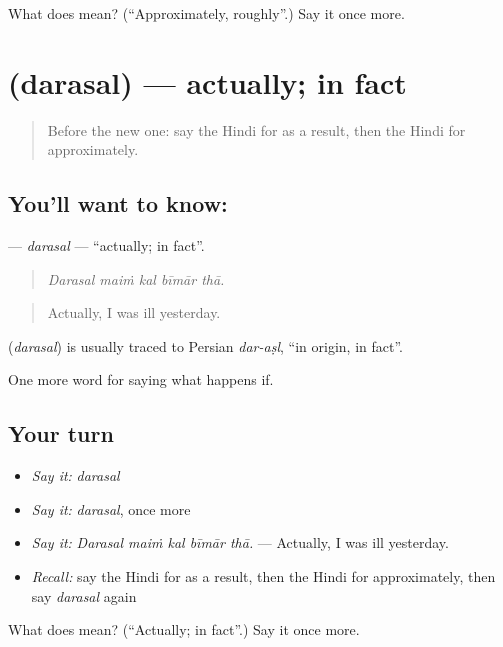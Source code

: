 \begin{tcolorbox}[breakable,colback=teal!4,colframe=teal!35!black,title={Before you move on}]
What does  mean? (\textquotedblleft{}Approximately, roughly\textquotedblright{}.) Say it once more.
\end{tcolorbox}
\section[\texorpdfstring{\hi{दरअसल} (darasal)}{दरअसल (darasal)}]{ (darasal) — actually; in fact}

\label{lesson:HI-C554-darasal}



\begin{quote}
Before the new one: say the Hindi for as a result, then the Hindi for approximately.
\end{quote}

\subsection*{You'll want to know: }
\textbf{} — \emph{darasal} — \textquotedblleft{}actually; in fact\textquotedblright{}.

\begin{quote}
    
\end{quote}

\begin{quote}
\emph{Darasal maiṁ kal bīmār thā.}
\end{quote}

\begin{quote}
Actually, I was ill yesterday.
\end{quote}

\begin{cousinweb}
\textbf{} (\emph{darasal}) is usually traced to Persian \emph{dar-aṣl}, \textquotedblleft{}in origin, in fact\textquotedblright{}.
\end{cousinweb}

\begin{grammarlens}[title={What you've built}]
One more word for saying what happens if.
\end{grammarlens}

\subsection*{Your turn}
\begin{itemize}
\raggedright
  \item \emph{Say it:} \emph{darasal}
  \item \emph{Say it:} \emph{darasal}, once more
  \item \emph{Say it:} \emph{Darasal maiṁ kal bīmār thā.} — Actually, I was ill yesterday.
  \item \emph{Recall:} say the Hindi for as a result, then the Hindi for approximately, then say \emph{darasal} again
\end{itemize}

\begin{tcolorbox}[breakable,colback=teal!4,colframe=teal!35!black,title={Before you move on}]
What does  mean? (\textquotedblleft{}Actually; in fact\textquotedblright{}.) Say it once more.
\end{tcolorbox}
